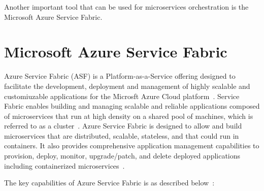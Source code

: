 Another important tool that can be used for microservices
orchestration is the Microsoft Azure Service Fabric.



\section{Microsoft Azure Service Fabric}
Azure Service Fabric (ASF) is a Platform-as-a-Service offering
designed to facilitate the development, deployment and management of
highly scalable and customiuzable applications for the Microsft Azure
Cloud platform~\cite{hid-sp18-501-definition}. Service Fabric enables
building and managing scalable and reliable applications composed of
microservices that run at high density on a shared pool of machines,
which is referred to as a cluster~\cite{hid-sp18-501-overview}. 
Azure Service Fabric is designed to allow and build microservices that are
distributed, scalable, stateless, and that could run in containers.
It also provides
comprehensive application management capabilities to provision,
deploy, monitor, upgrade/patch, and delete deployed applications
including containerized microservices~\cite{hid-sp18-501-overview}.

The key capabilities of Azure Service Fabric is as described
below~\cite{hid-sp18-501-overview}:

